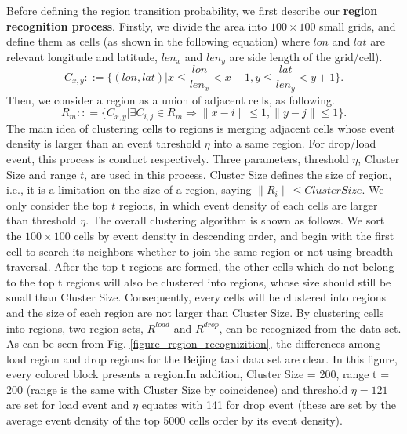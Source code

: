 Before defining the region transition probability, we first describe our \textbf{region recognition process}.
Firstly, we divide the area into $100\times 100$ small grids, and define them as cells (as shown in the following equation) where $lon$ and $lat$ are relevant longitude and latitude, $len_x$ and $len_y$ are side length of the grid/cell).
\[C_{x,y}::=\{(lon,lat)|x \le \frac{{lon}}{{len_x}} < x + 1,
y \le \frac{{lat}}{{len_y}} < y + 1\}.\]
Then, we consider a region as a union of adjacent cells, as following.
\[R_m:: = \{ C_{x,y}|\exists C_{i,j} \in R_m
\Rightarrow \|x - i\| \le 1,\|y - j\| \le 1\}.\]
The main idea of clustering cells to regions is merging adjacent cells whose event density is larger than an event threshold $\eta$ into a same region.
For drop/load event, this process is conduct respectively. 
Three parameters, threshold $\eta$, Cluster Size and range $t$, are used in this process. 
Cluster Size defines the size of region, i.e., it is a limitation on the size of a region, saying $\|R_i\|\leq ClusterSize$.
We only consider the top $t$ regions, in which event density of each cells are larger than threshold $\eta$.
The overall clustering algorithm is shown as follows. We sort the $100 \times 100$ cells by event density in descending order, 
and begin with the first cell to search its neighbors whether to join the same region or not using breadth traversal. 
After the top t regions are formed, the other cells which do not belong to the top t regions will also be clustered into regions, 
whose size should still be small than Cluster Size. Consequently, every cells will be clustered into regions and the size of each region are not larger than Cluster Size.
By clustering cells into regions, two region sets, \textbf{$R^{load}$} and \textbf{$R^{drop}$}, can be recognized from the data set. As can be seen from Fig. \ref{figure_region_recognizition}, the differences among load region and drop regions for the Beijing taxi data set are clear.
In this figure, every colored block presents a region.In addition, Cluster Size = 200, range t = 200 (range is the same with Cluster Size by coincidence) and threshold $\eta = 121$ are set for load event and $\eta$ equates with 141 for drop event (these are set by the average event density of the top 5000 cells order by its event density).
